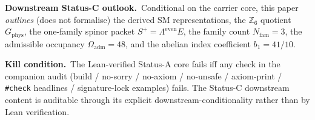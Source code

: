 \begin{tfptclaimcontract}
\smallskip
\textbf{Downstream Status-C outlook.}\ Conditional on the carrier core, this paper \emph{outlines}
(does not formalise) the derived SM representations, the $\mathbb Z_6$ quotient
$G_{\mathrm{phys}}$, the one-family spinor packet $S^+ = \Lambda^{\mathrm{even}} E$, the family
count $N_{\mathrm{fam}} = 3$, the admissible occupancy $\Omega_{\mathrm{adm}} = 48$, and the
abelian index coefficient $b_1 = 41/10$.

\smallskip
\textbf{Kill condition.}\ The Lean-verified Status-A core fails iff any check in the companion
audit (build / no-sorry / no-axiom / no-unsafe / axiom-print / \texttt{\#check} headlines /
signature-lock examples) fails. The Status-C downstream content is auditable through its
explicit downstream-conditionality rather than by Lean verification.
\end{tfptclaimcontract}

